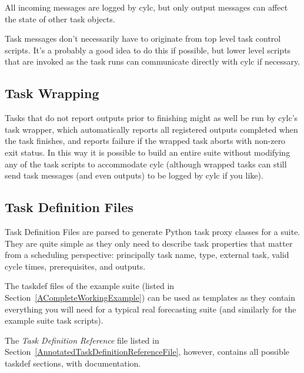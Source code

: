 \documentclass[11pt,a4paper]{article}
\begin{document}
All incoming messages are logged by cylc, but only output messages can
affect the state of other task objects.

Task messages don't necessarily have to originate from top level task
control scripts. It's a probably a good idea to do this if possible, but
lower level scripts that are invoked as the task runs can communicate
directly with cylc if necessary.

\subsection{Task Wrapping}
\label{TaskWrapping}

Tasks that do not report outputs prior to finishing might as well be 
run by cylc's task wrapper, which automatically reports all registered 
outputs completed when the task finishes, and reports failure if the
wrapped task aborts with non-zero exit status. In this way it is
possible to build an entire suite without modifying any of the task
scripts to accommodate cylc (although wrapped tasks can still send 
task messages (and even outputs) to be logged by cylc if you like).

\subsection{Task Definition Files} 
\label{TaskDefinitionFiles}

Task Definition Files are parsed to generate Python task proxy
classes for a suite. They are quite simple as they only need to 
describe task properties that matter from a scheduling perspective:
principally task name, type, external task, valid cycle times,
prerequisites, and outputs.  

The taskdef files of the example suite (listed in
Section~\ref{ACompleteWorkingExample}) can be used as templates as they
contain everything you will need for a typical real forecasting suite 
(and similarly for the example suite task scripts).

The {\em Task Definition Reference} file listed in
Section~\ref{AnnotatedTaskDefinitionReferenceFile}, however, contains
all possible taskdef sections, with documentation.

\end{document}
